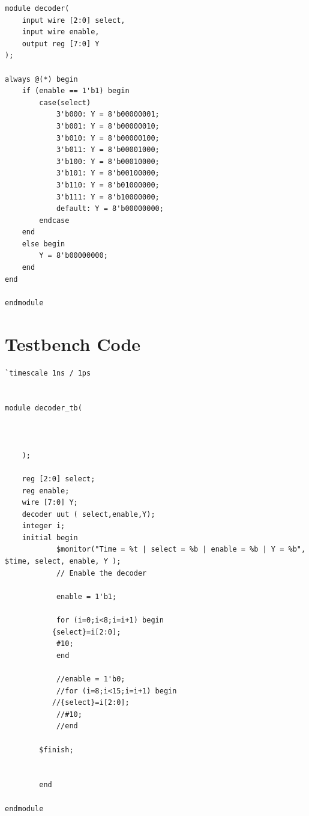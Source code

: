 \documentclass[12pt,a4paper]{report}
\begin{document}
\begin{verilogbox}
\begin{lstlisting}
module decoder(
    input wire [2:0] select,
    input wire enable,
    output reg [7:0] Y
);

always @(*) begin
    if (enable == 1'b1) begin
        case(select)
            3'b000: Y = 8'b00000001;
            3'b001: Y = 8'b00000010;
            3'b010: Y = 8'b00000100;
            3'b011: Y = 8'b00001000;
            3'b100: Y = 8'b00010000;
            3'b101: Y = 8'b00100000;
            3'b110: Y = 8'b01000000;
            3'b111: Y = 8'b10000000;
            default: Y = 8'b00000000;
        endcase
    end
    else begin
        Y = 8'b00000000;
    end
end

endmodule
\end{lstlisting}
\end{verilogbox}

\section{Testbench Code}

\begin{verilogbox}
\begin{lstlisting}
`timescale 1ns / 1ps


module decoder_tb(



    );
    
    reg [2:0] select;
    reg enable;
    wire [7:0] Y;
    decoder uut ( select,enable,Y);
    integer i;
    initial begin
            $monitor("Time = %t | select = %b | enable = %b | Y = %b", $time, select, enable, Y );
            // Enable the decoder
            
            enable = 1'b1;
            
            for (i=0;i<8;i=i+1) begin
           {select}=i[2:0];
            #10;
            end
            
            //enable = 1'b0;
            //for (i=8;i<15;i=i+1) begin
           //{select}=i[2:0];
            //#10;
            //end
            
        $finish;
        
        
        end 
    
endmodule





\end{lstlisting}
\end{verilogbox}
\end{document}
